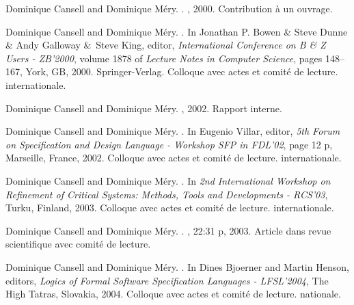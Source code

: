 \documentclass[ 12pt]{article}
\begin{document}
\begin{thebibliography}{100}
Dominique Cansell and Dominique M{\'e}ry.
.
, 2000.
\newblock Contribution {\`a} un ouvrage.

Dominique Cansell and Dominique M{\'e}ry.
.
\newblock In Jonathan P. Bowen \& Steve Dunne \& Andy Galloway \&~Steve King,
  editor, {\em {International Conference on B \& Z Users - ZB'2000}}, volume
  1878 of {\em Lecture Notes in Computer Science}, pages 148--167, York, GB,
  2000. {Springer-Verlag}.
\newblock Colloque avec actes et comit{\'e} de lecture. internationale.

Dominique Cansell and Dominique M{\'e}ry.
, 2002.
\newblock Rapport interne.

Dominique Cansell and Dominique M{\'e}ry.
.
\newblock In Eugenio Villar, editor, {\em {5th Forum on Specification and
  Design Language - Workshop SFP in FDL'02}}, page 12 p, Marseille, France,
  2002.
\newblock Colloque avec actes et comit{\'e} de lecture. internationale.

Dominique Cansell and Dominique M{\'e}ry.
.
\newblock In {\em {2nd International Workshop on Refinement of Critical
  Systems: Methods, Tools and Developments - RCS'03}}, Turku, Finland, 2003.
\newblock Colloque avec actes et comit{\'e} de lecture. internationale.

Dominique Cansell and Dominique M{\'e}ry.
.
, 22:31 p, 2003.
\newblock Article dans revue scientifique avec comit{\'e} de lecture.

Dominique Cansell and Dominique M{\'e}ry.
.
\newblock In Dines Bjoerner and Martin Henson, editors, {\em {Logics of Formal
  Software Specification Languages - LFSL'2004}}, The High Tatras, Slovakia,
  2004.
\newblock Colloque avec actes et comit{\'e} de lecture. nationale.


\end{thebibliography}
\end{document}
